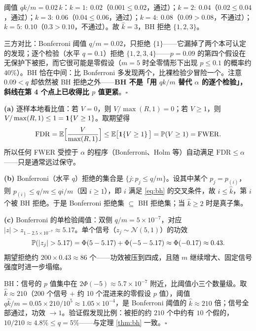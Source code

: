 \begin{description}[style=nextline, itemsep=1.2ex]
\item[练习 \ref{ex:bh-hand}（手算 BH）]
阈值 $qk/m = 0.02\,k$：$k=1{:}\ 0.02$（$0.001 \le 0.02$，通过）；$k=2{:}\ 0.04$（$0.02 \le 0.04$，通过）；$k=3{:}\ 0.06$（$0.04 \le 0.06$，通过）；$k=4{:}\ 0.08$（$0.09 > 0.08$，不通过）；$k=5{:}\ 0.10$（$0.3 > 0.10$，不通过）。故 $\hat{k} = 3$，BH 拒绝 $\{1, 2, 3\}$。

三方对比：Bonferroni 阈值 $q/m = 0.02$，只拒绝 $\{1\}$——它漏掉了两个本可认定的发现；逐个检验（水平 $q=0.1$）拒绝 $\{1,2,3,4\}$——$p=0.09$ 的第四个假设在无保护下被拒，而它很可能是零假设（$m=5$ 时全零情形下出现 $p \le 0.1$ 的概率约 $40\%$）。BH 恰在中间：比 Bonferroni 多发现两个，比裸检验少冒险一个。注意 $0.09 < q$ 却依然被 BH 拒绝之外——\textbf{BH 不是「用 $qk/m$ 替代 $\alpha$ 的逐个检验」，斜线在第 4 个点上已收得比 $p$ 值更紧}。$\square$

\item[练习 \ref{ex:bh-bonf}（FDR 与 FWER；两条程序的包含关系）]
\textbf{(a)} 逐样本地看比值：若 $V = 0$，则 $V/\max(R,1) = 0$；若 $V \ge 1$，则 $V/\max(R,1) \le 1 = \mathbf{1}\!\left\{V \ge 1\right\}$。取期望得
\[
  \mathrm{FDR} = \mathbb{E}\Big[\frac{V}{\max(R,1)}\Big] \le \mathbb{E}\big[\mathbf{1}\!\left\{V \ge 1\right\}\big] = \mathbb{P}(V \ge 1) = \mathrm{FWER}.
\]
所以任何 FWER 受控于 $\alpha$ 的程序（Bonferroni、Holm 等）自动满足 $\mathrm{FDR} \le \alpha$——只是通常远过保守。

\textbf{(b)} Bonferroni（水平 $q$）拒绝的集合是 $\{ j : p_j \le q/m \}$。设其中某个 $p_j = p_{(i)}$，则 $p_{(i)} \le q/m \le q i/m$（因 $i \ge 1$），即 $i$ 满足 \eqref{eq:bh} 的交叉条件，故 $i \le \hat{k}$，第 $i$ 个被 BH 拒绝。于是 Bonferroni 拒绝集 $\subseteq$ BH 拒绝集；当 $\hat{k} \ge 2$ 时是真子集。

\textbf{(c)} Bonferroni 的单检验阈值：双侧 $q/m = 5\times 10^{-7}$，对应 $|z| > z_{1-2.5\times10^{-7}} \approx 5.17$。单个信号（$z_j \sim \mathcal{N}(5,1)$）的功效
\[
  \mathbb{P}(|z_j| > 5.17) = \Phi(5 - 5.17) + \Phi(-5 - 5.17) \approx \Phi(-0.17) \approx 0.43 .
\]
期望拒绝约 $200 \times 0.43 \approx 86$ 个——功效被压到四成，且随 $m$ 继续增大、固定信号强度时进一步塌缩。

BH：信号的 $p$ 值集中在 $2\Phi(-5) \approx 5.7\times 10^{-7}$ 附近，比阈值小三个数量级。取 $\hat{k} \approx 210$（200 个信号 + 约 10 个混进来的零假设 $p$ 值），阈值 $q\hat{k}/m = 0.05 \times 210 / 10^5 \approx 1.05 \times 10^{-4}$，是 Bonferroni 阈值的 $\hat{k} \approx 210$ 倍；信号全部通过，功效 $\to 1$。验证假发现比例：被拒的约 $210$ 个中约有 $10$ 个假的，$10/210 \approx 4.8\% \le q = 5\%$——与定理 \ref{thm:bh} 一致。$\square$


\end{description}
